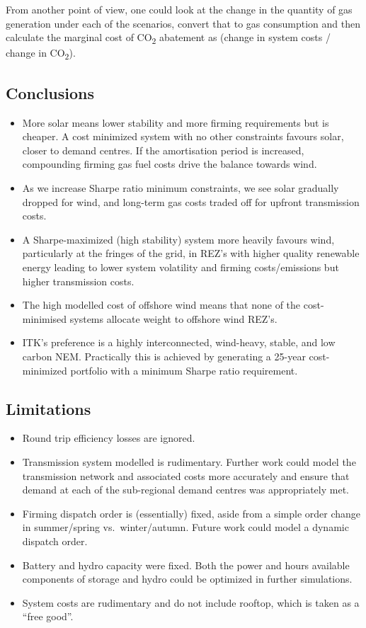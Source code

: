 \documentclass[
  letterpaper,
  DIV=11,
  numbers=noendperiod]{scrartcl}
\begin{document}
From another point of view, one could look at the change in the quantity
of gas generation under each of the scenarios, convert that to gas
consumption and then calculate the marginal cost of CO\textsubscript{2}
abatement as (change in system costs / change in CO\textsubscript{2}).

\subsection{Conclusions}\label{conclusions}

\begin{itemize}
\item
  More solar means lower stability and more firming requirements but is
  cheaper. A cost minimized system with no other constraints favours
  solar, closer to demand centres. If the amortisation period is
  increased, compounding firming gas fuel costs drive the balance
  towards wind.
\item
  As we increase Sharpe ratio minimum constraints, we see solar
  gradually dropped for wind, and long-term gas costs traded off for
  upfront transmission costs.
\item
  A Sharpe-maximized (high stability) system more heavily favours wind,
  particularly at the fringes of the grid, in REZ's with higher quality
  renewable energy leading to lower system volatility and firming
  costs/emissions but higher transmission costs.
\item
  The high modelled cost of offshore wind means that none of the
  cost-minimised systems allocate weight to offshore wind REZ's.
\item
  ITK's preference is a highly interconnected, wind-heavy, stable, and
  low carbon NEM. Practically this is achieved by generating a 25-year
  cost-minimized portfolio with a minimum Sharpe ratio requirement.
\end{itemize}

\subsection{Limitations}\label{limitations}

\begin{itemize}
\item
  Round trip efficiency losses are ignored.
\item
  Transmission system modelled is rudimentary. Further work could model
  the transmission network and associated costs more accurately and
  ensure that demand at each of the sub-regional demand centres was
  appropriately met.
\item
  Firming dispatch order is (essentially) fixed, aside from a simple
  order change in summer/spring vs.~winter/autumn. Future work could
  model a dynamic dispatch order.
\item
  Battery and hydro capacity were fixed. Both the power and hours
  available components of storage and hydro could be optimized in
  further simulations.
\item
  System costs are rudimentary and do not include rooftop, which is
  taken as a ``free good''.
\end{itemize}
\end{document}
